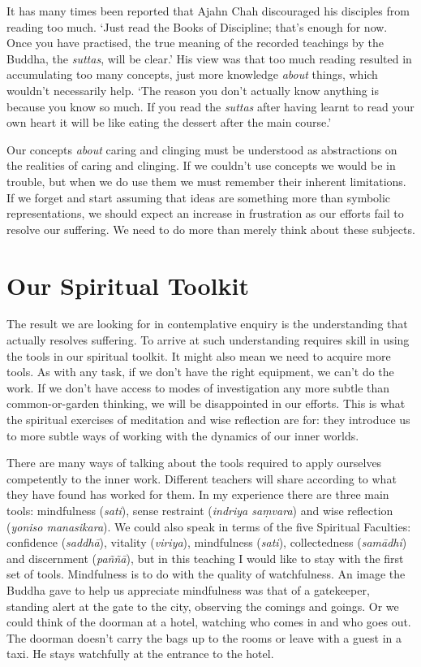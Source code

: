 It has many times been reported that Ajahn Chah discouraged his
disciples from reading too much. ‘Just read the Books of Discipline;
that’s enough for now. Once you have practised, the true meaning of the
recorded teachings by the Buddha, the \emph{suttas}, will be clear.’ His view
was that too much reading resulted in accumulating too many concepts,
just more knowledge \emph{about} things, which wouldn’t necessarily help.
‘The reason you don’t actually know anything is because you know so
much. If you read the \emph{suttas} after having learnt to read your own
heart it will be like eating the dessert after the main course.’

Our concepts \emph{about} caring and clinging must be understood as
abstractions on the realities of caring and clinging. If we couldn’t use
concepts we would be in trouble, but when we do use them we must
remember their inherent limitations. If we forget and start assuming
that ideas are something more than symbolic representations, we should
expect an increase in frustration as our efforts fail to resolve our
suffering. We need to do more than merely think about these subjects.

\section{Our Spiritual Toolkit}

The result we are looking for in contemplative enquiry is the
understanding that actually resolves suffering. To arrive at such
understanding requires skill in using the tools in our spiritual
toolkit. It might also mean we need to acquire more tools. As with any
task, if we don’t have the right equipment, we can’t do the work. If we
don’t have access to modes of investigation any more subtle than
common-or-garden thinking, we will be disappointed in our efforts. This
is what the spiritual exercises of meditation and wise reflection are
for: they introduce us to more subtle ways of working with the dynamics
of our inner worlds.

There are many ways of talking about the tools required to apply
ourselves competently to the inner work. Different teachers will share
according to what they have found has worked for them. In my experience
there are three main tools: mindfulness (\emph{sati}), sense restraint
(\emph{indriya saṃvara}) and wise reflection (\emph{yoniso manasikara}). We could
also speak in terms of the five Spiritual Faculties: confidence
(\emph{saddhā}), vitality (\emph{viriya}), mindfulness (\emph{sati}), collectedness
(\emph{samādhi}) and discernment (\emph{paññā}), but in this teaching I would like
to stay with the first set of tools. Mindfulness is to do with the
quality of watchfulness. An image the Buddha gave to help us appreciate
mindfulness was that of a gatekeeper, standing alert at the gate to the
city, observing the comings and goings. Or we could think of the doorman
at a hotel, watching who comes in and who goes out. The doorman doesn’t
carry the bags up to the rooms or leave with a guest in a taxi. He stays
watchfully at the entrance to the hotel.

